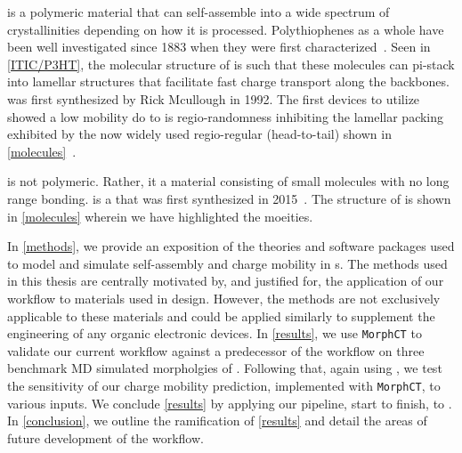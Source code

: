  is a polymeric material that can self-assemble into a wide spectrum of
crystallinities depending on how it is processed.
Polythiophenes as a whole have been well investigated 
since 1883 when they were first characterized~\cite{Poelking2014}.
Seen in \autoref{ITIC/P3HT}, the molecular structure of 
is such that these molecules can pi-stack into lamellar structures that facilitate fast charge transport along
the backbones.  was first synthesized by Rick Mcullough in 1992. The first devices to utilize  showed
a low mobility do to is regio-randomness inhibiting the lamellar packing exhibited by the now widely used
regio-regular (head-to-tail)  shown in \autoref{molecules}~\cite{Zaumseil2014}. 

 is not polymeric. Rather, it a material consisting of small molecules with no long range bonding.
 is a  that was first synthesized in 2015~\cite{Bai201U}. The structure of  is shown in
\autoref{molecules} wherein we have highlighted the moeities.  

In \autoref{methods}, we
provide an exposition of the theories and software packages used to model and simulate self-assembly and charge mobility in
s.
The methods used in this thesis are centrally motivated by, and justified for, 
the application of our workflow to materials
used in  design. However, the methods are
not exclusively applicable to these materials and could be applied similarly to supplement the engineering of any organic
electronic devices. 
In \autoref{results}, we use \texttt{MorphCT} to validate our current workflow against a predecessor of the 
workflow on three benchmark MD simulated morpholgies of . 
Following that, again using , we test the sensitivity of our charge mobility prediction, 
implemented with \texttt{MorphCT}, to various inputs. We conclude \autoref{results} by applying our pipeline,
start to finish, to . 
In \autoref{conclusion}, we outline the ramification of \autoref{results} and detail the areas of future development of the workflow. 

